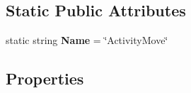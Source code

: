 \begin{DoxyCompactItemize}
\end{DoxyCompactItemize}
\subsection*{Static Public Attributes}
\begin{DoxyCompactItemize}
\item 
static string {\bfseries Name} = \char`\"{}Activity\+Move\char`\"{}\hypertarget{class_general_health_care_elements_1_1_activities_1_1_activity_move_a0938f60225b3456b3194a519dfa161df}{}\label{class_general_health_care_elements_1_1_activities_1_1_activity_move_a0938f60225b3456b3194a519dfa161df}

\end{DoxyCompactItemize}
\subsection*{Properties}
